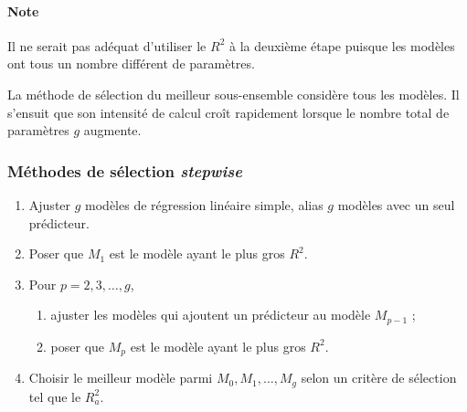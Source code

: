 \documentclass[french]{article}
\begin{document}
\begin{multicols*}{2}
\begin{algo2}
\paragraph{Note}	Il ne serait pas adéquat d'utiliser le $R^{2}$ à la deuxième étape puisque les modèles ont tous un nombre différent de paramètres.
\end{algo2}

\begin{rappel_enhanced}[Limitation]
La méthode de sélection du meilleur sous-ensemble considère tous les  modèles. Il s'ensuit que son intensité de calcul croît rapidement lorsque le nombre total de paramètres $g$ augmente.
\end{rappel_enhanced}


\subsubsection{Méthodes de sélection \og \textit{stepwise} \fg{}}
\begin{algo2}
\begin{enumerate}[label = \circled{\arabic*}{trueblue}]
	\item	Ajuster $g$ modèles de régression linéaire simple, alias $g$ modèles avec un seul prédicteur.
	\item	Poser que $M_{1}$ est le modèle ayant le plus gros $R^{2}$.
	\item	Pour $p = 2, 3, \dots, g$, 
		\begin{enumerate}[label = \circled{\scriptsize{(\alph*)}}{trueblue!80!white}]
			\item	ajuster les modèles qui ajoutent un prédicteur au modèle $M_{p - 1}$ ;
			\item	poser que $M_{p}$ est le modèle ayant le plus gros $R^{2}$.
		\end{enumerate}
	\item	Choisir le meilleur modèle parmi $M_{0}, M_{1}, \dots, M_{g}$ selon un critère de sélection tel que le $R^{2}_{a}$.
\end{enumerate}
\end{algo2}


\end{multicols*}
\end{document}
